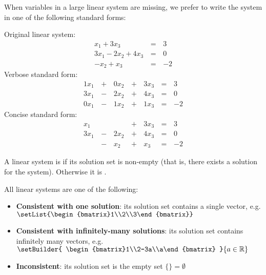 \begin{remark}
  When variables in a large linear system are missing, we prefer to
  write the system in one of the following standard forms:

  \begin{multicols}{3}\noindent
    Original linear system:
    \begin{alignat*}{2}
       x_1 + 3x_3 &\,=\,& 3 \\
      3x_1 - 2x_2 + 4x_3 &\,=\,& 0 \\
      -x_2 +  x_3 &\,=\,& -2
    \end{alignat*}
    Verbose standard form:
    \begin{alignat*}{4}
      1x_1 &\,+\,& 0x_2 &\,+\,& 3x_3 &\,=\,& 3 \\
      3x_1 &\,-\,& 2x_2 &\,+\,& 4x_3 &\,=\,& 0 \\
      0x_1 &\,-\,& 1x_2 &\,+\,& 1x_3 &\,=\,& -2
    \end{alignat*}
    Concise standard form:
    \begin{alignat*}{4}
       x_1 &     &      &\,+\,& 3x_3 &\,=\,& 3 \\
      3x_1 &\,-\,& 2x_2 &\,+\,& 4x_3 &\,=\,& 0 \\
           &\,-\,&  x_2 &\,+\,&  x_3 &\,=\,& -2
    \end{alignat*}
  \end{multicols}
\end{remark}

\begin{definition}
  A linear system is  if its solution set
  is non-empty (that is, there exists a solution for the
  system). Otherwise it is .
\end{definition}

\begin{fact}
  All linear systems are one of the following:
  \begin{itemize}
    \item \textbf{Consistent with one solution}:
          its solution set contains a single vector, e.g.
          \(\setList{\begin{bmatrix}1\\2\\3\end{bmatrix}}\)
    \item \textbf{Consistent with infinitely-many solutions}:
          its solution set contains infinitely many vectors, e.g.
          \(
            \setBuilder
            {
              \begin{bmatrix}1\\2-3a\\a\end{bmatrix}
            }{
              a\in\IR
            }
          \)
    \item \textbf{Inconsistent}:
          its solution set is the empty set \(\{\}=\emptyset\)
  \end{itemize}
\end{fact}

